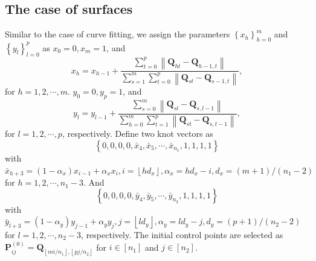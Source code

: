 \documentclass[11pt]{article}
\numberwithin{equation}{section}
\begin{document}
\subsection{The case of surfaces}\label{section7.2}
Similar to the case of curve fitting, we assign the parameters $\left\{x_h\right\}_{h=0}^m$ and $\left\{y_l\right\}_{l=0}^p$ as $x_0=0, x_m=1$, and
$$
x_h=x_{h-1}+\frac{\sum_{t=0}^p\left\|\boldsymbol{Q}_{h t}-\boldsymbol{Q}_{h-1, t}\right\|}{\sum_{s=1}^m \sum_{t=0}^p\left\|\boldsymbol{Q}_{s t}-\boldsymbol{Q}_{s-1, t}\right\|},
$$
for $h=1,2, \cdots, m$. $y_0=0, y_p=1$, and
$$
y_l=y_{l-1}+\frac{\sum_{s=0}^m\left\|\boldsymbol{Q}_{s l}-\boldsymbol{Q}_{s, l-1}\right\|}{\sum_{h=0}^m \sum_{t=1}^p\left\|\boldsymbol{Q}_{s t}-\boldsymbol{Q}_{s, t-1}\right\|},
$$
for $l=1,2, \cdots, p$, respectively. Define two knot vectors as
$$
\left\{0,0,0,0, \bar{x}_4, \bar{x}_5, \cdots, \bar{x}_{n_1}, 1,1,1,1\right\}
$$
with $\bar{x}_{h+3}=\left(1-\alpha_x\right) x_{i-1}+\alpha_x x_i, i=\left\lfloor h d_x\right\rfloor, \alpha_x=h d_x-i, d_x=(m+1) /\left(n_1-2\right)$ for $h=1,2, \cdots, n_1-3$. And
$$
\left\{0,0,0,0, \bar{y}_4, \bar{y}_5, \cdots, \bar{y}_{n_2}, 1,1,1,1\right\}
$$
with $\bar{y}_{l+3}=\left(1-\alpha_y\right) y_{j-1}+\alpha_y y_j, j=\left\lfloor l d_y\right\rfloor, \alpha_y=l d_y-j, d_y=(p+1) /\left(n_2-2\right)$ for $l=1,2, \cdots, n_2-3$, respectively. The initial control points are selected as $\boldsymbol{P}_{i j}^{(0)}=\boldsymbol{Q}_{\left\lfloor m i / n_1\right\rfloor,\left\lfloor p j / n_2\right\rfloor}$ for $i \in\left[n_1\right]$ and $j \in\left[n_2\right]$. 
\end{document}
